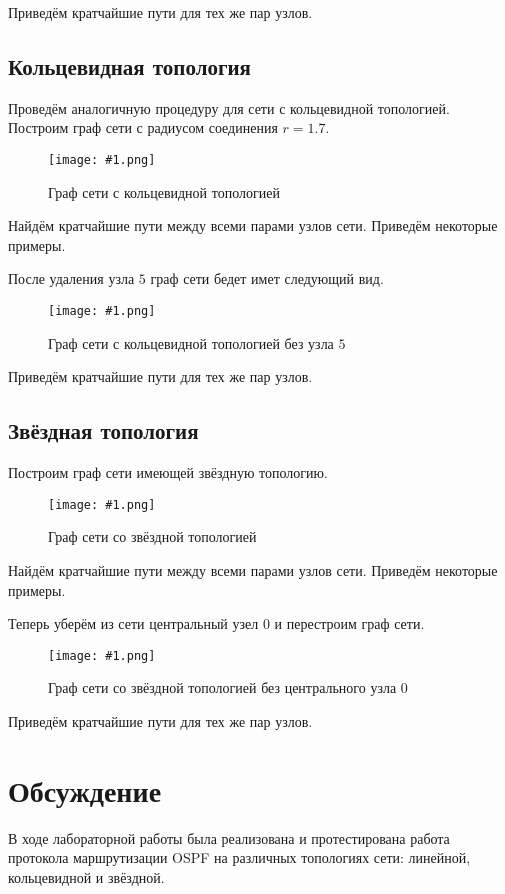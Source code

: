 \documentclass[a4paper,12pt]{article}
\newcommand{\plot}[3]{
    \begin{figure}[H]
        \centering
        \texttt{[image: \#1.png]}
        \caption{#2}
        \label{#3}
    \end{figure}
}
\begin{document}
Приведём кратчайшие пути для тех же пар узлов.



\subsection{Кольцевидная топология}
Проведём аналогичную процедуру для сети с кольцевидной топологией. Построим граф сети с радиусом соединения $r = 1.7$.

\plot{r_f}{Граф сети с кольцевидной топологией}{p:fullRing}

Найдём кратчайшие пути между всеми парами узлов сети. Приведём некоторые примеры.



После удаления узла $5$ граф сети бедет имет следующий вид.

\plot{r_r}{Граф сети с кольцевидной топологией без узла $5$}{p:rmRing}

Приведём кратчайшие пути для тех же пар узлов.



\subsection{Звёздная топология}
Построим граф сети имеющей звёздную топологию.

\plot{s_f}{Граф сети со звёздной топологией}{p:fullStar}

Найдём кратчайшие пути между всеми парами узлов сети. Приведём некоторые примеры.



Теперь уберём из сети центральный узел $0$ и перестроим граф сети.

\plot{s_r}{Граф сети со звёздной топологией без центрального узла $0$}{p:rmStar}

Приведём кратчайшие пути для тех же пар узлов.



\section{Обсуждение}

В ходе лабораторной работы была реализована и протестирована работа протокола маршрутизации OSPF на различных топологиях сети: линейной, кольцевидной и звёздной.
\end{document}
